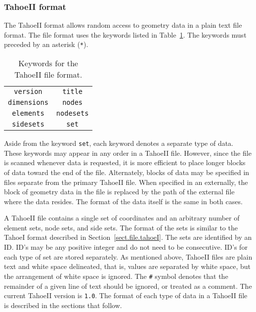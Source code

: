 \subsubsection{TahoeII format}
\label{sect.file.tahoeII}
The TahoeII format allows random access to geometry data in a plain 
text file format. The file format uses the keywords listed
in Table~\ref{tab.TahoeII.keywords}. The keywords must preceded by an
asterisk (\texttt{*}).
\begin{table}[h]
\caption{\label{tab.TahoeII.keywords} Keywords for the TahoeII file format.}
\begin{center}
\begin{tabular}[c]{cc}
\parbox[b]{2.0in}{\centering \texttt{version}} &
\parbox[b]{2.0in}{\centering \texttt{title}}\\
\parbox[b]{2.0in}{\centering \texttt{dimensions}} & 
\parbox[b]{2.0in}{\centering \texttt{nodes}}\\
\parbox[b]{2.0in}{\centering \texttt{elements}}  & 
\parbox[b]{2.0in}{\centering \texttt{nodesets}}\\
\parbox[b]{2.0in}{\centering \texttt{sidesets}}  & 
\parbox[b]{2.0in}{\centering \texttt{set}}\\
\end{tabular}
\end{center}
\end{table}
Aside from the keyword \texttt{set}, each keyword denotes a separate 
type of data. These keywords may appear in any order in a TahoeII file.
However, since the file is scanned whenever data is requested, it is 
more efficient to place longer blocks of data toward the end of the 
file. Alternately, blocks of data may be specified in files separate 
from the primary TahoeII file.
When specified in an externally, the block 
of geometry data in the file is replaced by the path of 
the external file where the data resides. The format of the data 
itself is the same in both cases.

A TahoeII file contains a single set of coordinates and an arbitrary 
number of element sets, node sets, and side sets. 
The format of the sets is similar to the TahoeI format described in 
Section~\ref{sect.file.tahoeI}.
The sets are 
identified by an ID. ID's may be any positive integer and do not need 
to be consecutive. ID's for each type of set are stored separately.
As mentioned above, TahoeII files are plain text and
white space delineated, that is, 
values are separated by white space, but the arrangement of white space
is ignored.
The \texttt{\#} symbol denotes that the remainder of a given line of text 
should be ignored, or treated as a comment.
The current TahoeII version is \texttt{1.0}. The format of each type of
data in a TahoeII file is described in the sections that follow.

